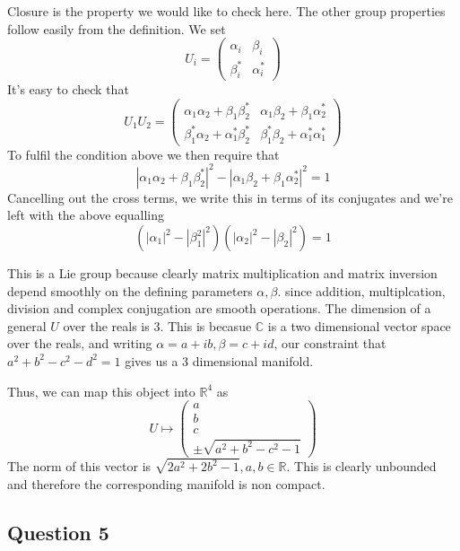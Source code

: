 \documentclass[11pt, oneside]{article}   	%
\theoremstyle{slanted}
\begin{document}
Closure is the property we would like to check here. The other group properties follow easily from the definition.
We set \[
U_i = \begin{pmatrix}
\alpha_i & \beta_i \\
\beta_i^* & \alpha_i^*
\end{pmatrix} 
\] 
It's easy to check that 
\[ 
U_1 U_2 = \begin{pmatrix} 
\alpha_1\alpha_2 + \beta_1 \beta_2^* & \alpha_1\beta_2  +\beta_1\alpha_2^* \\
\beta_1^*\alpha_2 + \alpha_1^* \beta_2^* & \beta_1^* \beta_2 + \alpha_1^*\alpha_1^* 
\end{pmatrix}
\]
To fulfil the condition above we then require that 
\[
|\alpha_1\alpha_2 + \beta_1\beta_2^*|^2 - |\alpha_1 \beta_2 + \beta_1 \alpha_2^*|^2 = 1
\] 
Cancelling out the cross terms, we write this in terms of its conjugates and we're left with the above equalling 
\[ 
\left( |\alpha_1|^2 - |\beta_1^2|^2 \right)\left( |\alpha_2|^2 - |\beta_2|^2 \right) = 1
\] 

This is a Lie group because clearly matrix multiplication and matrix inversion depend smoothly on the defining parameters $\alpha, \beta$. since addition, multiplcation, division and complex conjugation are smooth operations.
The dimension of a general $U$ over the reals is 3. This is becasue $\mathbb{C}$ is a two dimensional vector space over the reals, and writing $\alpha = a + ib, \beta = c + id$, our constraint that $a^2 + b^2 - c^2 - d^2 = 1$ gives us a 3 dimensional manifold.

Thus, we can map this object into $\mathbb{R}^4$ as 
\[ 
U \mapsto \begin{pmatrix}
a \\ b \\ c \\ \pm \sqrt{a^2 + b^2 - c^2 - 1} \end{pmatrix}
\] 
The norm of this vector is $\sqrt{2 a^2 + 2b^2 - 1}, a, b \in \mathbb{R}$. This is clearly unbounded and therefore the corresponding manifold is non compact.   



\pagebreak
\subsection{Question 5} 
\end{document}
